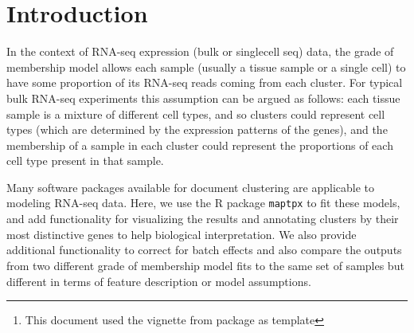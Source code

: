 \documentclass[12pt]{article}\usepackage[]{graphicx}\usepackage[usenames,dvipsnames]{color}
\author{Kushal K Dey, Chiaowen Joyce Hsiao \& Matthew Stephens \\[1em] \small{\textit{Stephens Lab}, The University of Chicago} \mbox{ }\\ \small{\texttt{$^*$Correspondending Email: mstephens@uchicago.edu}}}
\newcommand{\CountClust}{\textit{CountClust}}
\begin{document}
\maketitle

\begin{abstract}
  \vspace{1em}
 Grade of membership or GoM models (also known as admixture models or Latent Dirichlet Allocation") are a generalization of cluster models that allow each sample to have membership in multiple clusters. It is widely used to model ancestry of individuals in population genetics based on SNP/ microsatellite data and also in natural language processing for modeling documents \cite{Pritchard2000, Blei2003}.

This \R{} package implements tools to visualize the clusters obtained from fitting topic models using a Structure plot \cite{Rosenberg2002} and extract the top features/genes that distinguish the clusters. In presence of known technical or batch effects, the package also allows for correction of these confounding effects.

\vspace{1em}
\textbf{\CountClust{} version:} 1.2.2 \footnote{This document used the vignette from \Bioconductor{} package  as  template}
\end{abstract}




\newpage

\tableofcontents

\section{Introduction}

In the context of RNA-seq expression (bulk or singlecell seq) data, the grade of membership model allows each sample (usually a tissue sample or a single cell) to have some proportion of its RNA-seq reads coming from each cluster. For typical bulk RNA-seq experiments this assumption
can be argued as follows: each tissue sample is a mixture of different cell types, and so clusters could represent cell types (which are determined by the expression patterns of the genes), and the membership of a sample in each cluster could represent the proportions of each cell type present in that sample.

Many software packages available for document clustering are applicable to modeling RNA-seq data. Here, we use the R package {\tt maptpx} \cite{Taddy2012} to fit these models, and add functionality for visualizing the results and annotating clusters by their most distinctive genes to help biological interpretation. We also provide additional functionality to correct for batch effects and also compare the outputs from two different grade of membership model fits to the same set of samples but different in terms of feature description or model assumptions.
\end{document}
